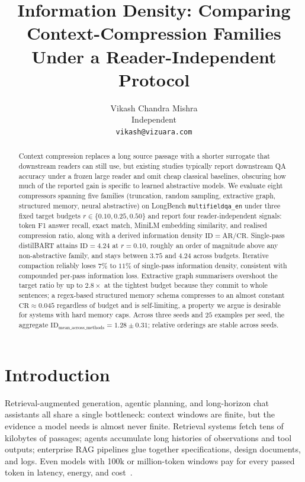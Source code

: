 \documentclass[11pt]{article}
\title{Information Density: Comparing Context-Compression Families Under a Reader-Independent Protocol}
\author{
  Vikash Chandra Mishra \\
  Independent \\
  \texttt{vikash@vizuara.com}
}
\begin{document}
\maketitle

\begin{abstract}
Context compression replaces a long source passage with a shorter
surrogate that downstream readers can still use, but existing studies
typically report downstream QA accuracy under a frozen large reader
and omit cheap classical baselines, obscuring how much of the
reported gain is specific to learned abstractive models. We evaluate
eight compressors spanning five families (truncation, random sampling,
extractive graph, structured memory, neural abstractive) on LongBench
\texttt{multifieldqa\_en} under three fixed target budgets
$r \in \{0.10, 0.25, 0.50\}$ and report four reader-independent
signals: token F1 answer recall, exact match, MiniLM embedding
similarity, and realised compression ratio, along with a derived
information density $\mathrm{ID} = \mathrm{AR} / \mathrm{CR}$. Single-pass
distilBART attains \textbf{$\mathrm{ID} = 4.24$} at $r = 0.10$, roughly
an order of magnitude above any non-abstractive family, and stays between
$3.75$ and $4.24$ across budgets. Iterative compaction reliably loses
$7\%$ to $11\%$ of single-pass information density, consistent with
compounded per-pass information loss. Extractive graph summarisers
overshoot the target ratio by up to $2.8\times$ at the tightest budget
because they commit to whole sentences; a regex-based structured memory schema compresses
to an almost constant $\mathrm{CR} \approx 0.045$ regardless of
budget and is self-limiting, a property we argue is desirable for
systems with hard memory caps. Across three seeds and $25$ examples
per seed, the aggregate
$\mathrm{ID}_{\mathrm{mean\_across\_methods}} = \mathbf{1.28 \pm 0.31}$;
relative orderings are stable across seeds.
\end{abstract}

\section{Introduction}
\label{sec:introduction}

Retrieval-augmented generation, agentic planning, and long-horizon chat
assistants all share a single bottleneck: context windows are finite, but
the evidence a model needs is almost never finite. Retrieval systems fetch
tens of kilobytes of passages; agents accumulate long histories of
observations and tool outputs; enterprise RAG pipelines glue together
specifications, design documents, and logs. Even models with 100k or
million-token windows pay for every passed token in latency, energy, and
cost~\citep{dao2022flashattention,beltagy2020longformer,zaheer2020bigbird}.
\end{document}

